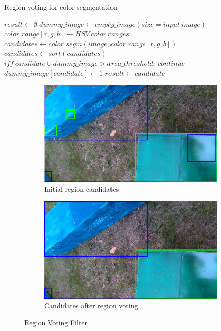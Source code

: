 \documentclass{ctuthesis}
\begin{document}
\begin{algorithm}
\caption{Region voting for color segmentation}\label{reg-vote}
\begin{algorithmic}[1]
\State $result \gets \emptyset$
\State $dummy\_image \gets empty\_image(size=input\ image)$
\State $color\_range[r,g,b] \gets HSV\ color\ ranges$
\State $candidates \gets color\_segm(image,color\_range[r,g,b])$
\State $candidates \gets sort(candidates)$
\State $iff\ candidate \cup dummy\_image > area\_threshold:\ continue$
\State $dummy\_image[candidate] \gets 1$
\State $result \gets candidate$
\EndFor
\end{algorithmic}
\end{algorithm}

\begin{figure}[htbp]
     \centering
     \begin{subfigure}{0.475\textwidth}
         \centering
         \includegraphics[width=\textwidth]{reg_vot_0.png}
         \caption{Initial region candidates}
         \label{fig: reg a}
     \end{subfigure}
     \hfill
     \begin{subfigure}{0.475\textwidth}
         \centering
         \includegraphics[width=\textwidth]{reg_vot_1.png}
         \caption{Candidates after region voting}
         \label{fig: reg b}
     \end{subfigure}

        \caption{Region Voting Filter}
        \label{fig: reg-v}
\end{figure}
\end{document}
